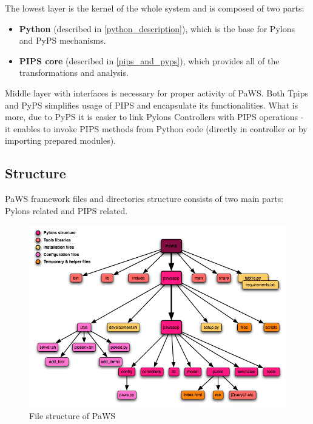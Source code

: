 The lowest layer is the kernel of the whole system and is composed of two parts:

\begin{itemize}
  \item {\bf Python} (described in \ref{python_description}), which is the base for Pylons and PyPS mechanisms.
  \item {\bf PIPS core} (described in \ref{pips_and_pyps}), which provides all of the transformations and analysis.
\end{itemize}

Middle layer with interfaces is necessary for proper activity of PaWS. Both Tpips and PyPS simplifies usage of PIPS and encapsulate its functionalities. What is more, due to PyPS it is easier to link Pylons Controllers with PIPS operations - it enables to invoke PIPS methods from Python code (directly in controller or by importing prepared modules).

\subsection{Structure}
\label{structure}

PaWS framework files and directories structure consists of two main parts: Pylons related and PIPS related.

\begin{figure}[h!]
  \centering
  \includegraphics[width=1.0\textwidth]{reportCh2/paws-structure}
  \caption{File structure of PaWS}
  \label{fig:paws_structure}
\end{figure} 

